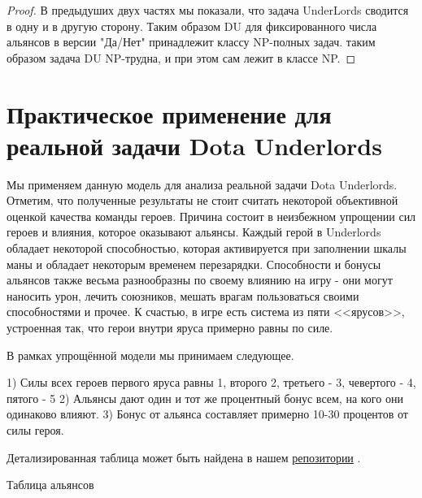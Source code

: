 \documentclass{article}
\begin{document}
\begin{proof}
	В предыдуших двух частях мы показали, что задача UnderLords сводится в одну и в другую сторону. Таким образом DU для фиксированного числа альянсов в версии "Да/Нет" принадлежит классу NP-полных задач.  таким образом задача DU NP-трудна, и при этом сам лежит в классе NP.
\end{proof}

\section{Практическое применение для реальной задачи Dota Underlords}
\label{SectionComputationalResults}
  
Мы применяем данную модель для анализа реальной задачи Dota Underlords. Отметим, что полученные результаты не стоит считать некоторой объективной оценкой качества команды героев. Причина состоит в неизбежном упрощении сил героев и влияния, которое оказывают альянсы. Каждый герой в Underlords обладает некоторой способностью, которая активируется при заполнении шкалы маны и обладает некоторым временем перезарядки. Способности и бонусы альянсов также весьма разнообразны по своему влиянию на игру - они могут наносить урон, лечить союзников, мешать врагам пользоваться своими способностями и прочее. К счастью, в игре есть система из пяти <<ярусов>>, устроенная так, что герои внутри яруса примерно равны по силе.

В рамках упрощённой модели мы принимаем следующее.

1) Силы всех героев первого яруса равны 1, второго 2, третьего - 3, чевертого - 4, пятого - 5
2) Альянсы дают один и тот же процентный бонус всем, на кого они одинаково влияют.
3) Бонус от альянса составляет примерно 10-30 процентов от силы героя.

Детализированная таблица может быть найдена в нашем \href{https://github.com/aponom84/UnderLords/blob/master/UnderLordsData.xlsx}{репозитории} \cite{UnderLoardsInput}.

Таблица альянсов \\
\end{document}
